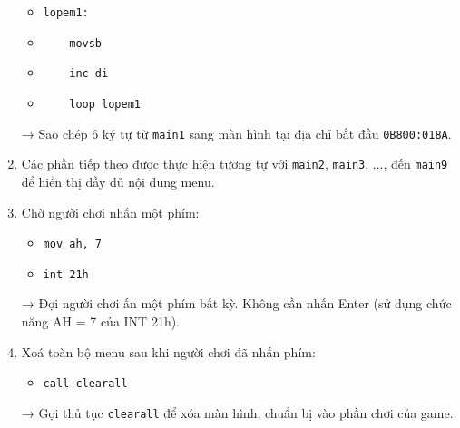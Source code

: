 \documentclass[12pt]{article}
\begin{document}
\begin{enumerate}[label=\textbf{\arabic*.}]
    \begin{itemize}
        \item \texttt{lopem1:}
        \item \texttt{\ \ \ \ movsb}
        \item \texttt{\ \ \ \ inc di}
        \item \texttt{\ \ \ \ loop lopem1}
    \end{itemize}

    → Sao chép 6 ký tự từ \texttt{main1} sang màn hình tại địa chỉ bắt đầu \texttt{0B800:018A}.

    \item Các phần tiếp theo được thực hiện tương tự với \texttt{main2}, \texttt{main3}, ..., đến \texttt{main9} để hiển thị đầy đủ nội dung menu.

    \item Chờ người chơi nhấn một phím:

    \begin{itemize}
        \item \texttt{mov ah, 7}
        \item \texttt{int 21h}
    \end{itemize}

    → Đợi người chơi ấn một phím bất kỳ. Không cần nhấn Enter (sử dụng chức năng AH = 7 của INT 21h).

    \item Xoá toàn bộ menu sau khi người chơi đã nhấn phím:

    \begin{itemize}
        \item \texttt{call clearall}
    \end{itemize}

    → Gọi thủ tục \texttt{clearall} để xóa màn hình, chuẩn bị vào phần chơi của game.
\end{enumerate}
\end{document}

